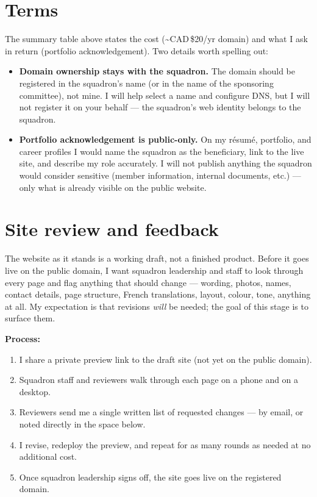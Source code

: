 \documentclass[11pt,letterpaper]{article}
\begin{document}
\section{Terms}

The summary table above states the cost (\textasciitilde{}CAD\,\$20/yr domain) and what I ask in return (portfolio acknowledgement). Two details worth spelling out:

\begin{itemize}[leftmargin=1.4em,itemsep=0.4em]
  \item \textbf{Domain ownership stays with the squadron.} The domain should be registered in the squadron's name (or in the name of the sponsoring committee), not mine. I will help select a name and configure DNS, but I will not register it on your behalf --- the squadron's web identity belongs to the squadron.
  \item \textbf{Portfolio acknowledgement is public-only.} On my résumé, portfolio, and career profiles I would name the squadron as the beneficiary, link to the live site, and describe my role accurately. I will not publish anything the squadron would consider sensitive (member information, internal documents, etc.) --- only what is already visible on the public website.
\end{itemize}

\section{Site review and feedback}\label{sec:review}

The website as it stands is a working draft, not a finished product. Before it goes live on the public domain, I want squadron leadership and staff to look through every page and flag anything that should change --- wording, photos, names, contact details, page structure, French translations, layout, colour, tone, anything at all. My expectation is that revisions \emph{will} be needed; the goal of this stage is to surface them.

\textbf{Process:}
\begin{enumerate}[leftmargin=1.6em,itemsep=0.25em]
  \item I share a private preview link to the draft site (not yet on the public domain).
  \item Squadron staff and reviewers walk through each page on a phone and on a desktop.
  \item Reviewers send me a single written list of requested changes --- by email, or noted directly in the space below.
  \item I revise, redeploy the preview, and repeat for as many rounds as needed at no additional cost.
  \item Once squadron leadership signs off, the site goes live on the registered domain.
\end{enumerate}
\end{document}
